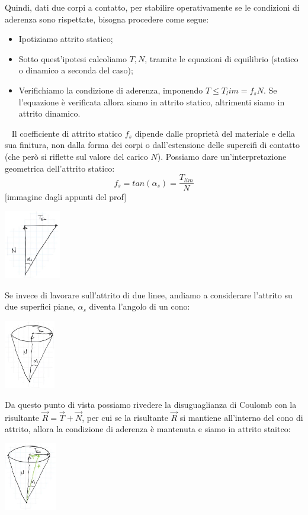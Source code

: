 \newline
Quindi, dati due corpi a contatto, per stabilire operativamente se le condizioni di aderenza sono rispettate, bisogna procedere come segue:
\begin{itemize}
    \item Ipotiziamo attrito statico;
    \item Sotto quest'ipotesi calcoliamo $T, N$, tramite le equazioni di equilibrio (statico o dinamico a seconda del caso);
    \item Verifichiamo la condizione di aderenza, imponendo $T \leq T_lim = f_s N$. Se l'equazione è verificata allora siamo in attrito statico, altrimenti siamo in attrito dinamico.
\end{itemize}
\ \newline
Il coefficiente di attrito statico $f_s$ dipende dalle proprietà del materiale e della sua finitura, non dalla forma dei corpi o dall'estensione delle supercifi di contatto (che però si riflette sul valore del carico $N$).\newline
\newline
Possiamo dare un'interpretazione geometrica dell'attrito statico:
\[
    f_s = tan(\alpha_s) = \frac{T_{lim}}{N}
\]
[immagine dagli appunti del prof]
\begin{center}
    \includegraphics[height=3cm]{../lezione10/img6.JPG}
\end{center}
Se invece di lavorare sull'attrito di due linee, andiamo a considerare l'attrito su due superfici piane, $\alpha_s$ diventa l'angolo di un cono:
\begin{center}
    \includegraphics[height=3cm]{../lezione10/img7.JPG}
\end{center}
Da questo punto di vista possiamo rivedere la disuguaglianza di Coulomb con la risultante $\vec{R} = \vec{T} + \vec{N}$, per cui se la risultante $\vec{R}$ si mantiene all'interno del cono di attrito, allora la condizione di aderenza è mantenuta e siamo in attrito staitco:
\begin{center}
    \includegraphics[height=3cm]{../lezione10/img8.JPG}
\end{center}
